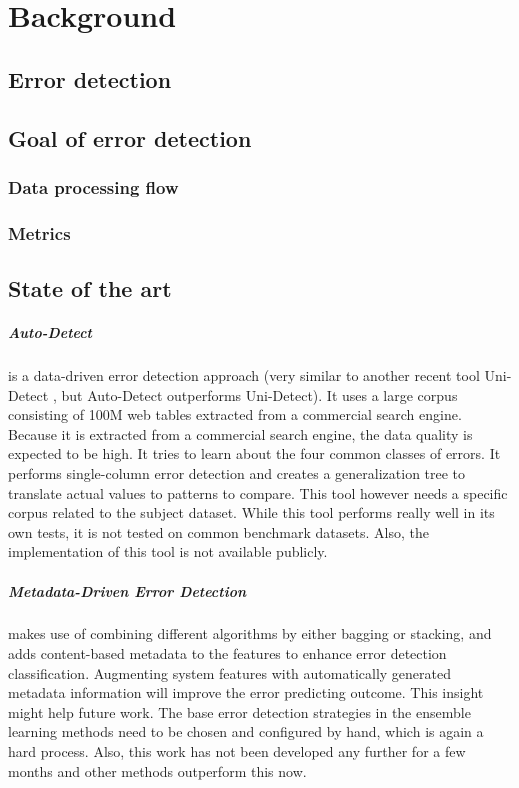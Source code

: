 \chapter{Background}
\section{Error detection}

\section{Goal of error detection}
\subsection{Data processing flow}

\subsection{Metrics}


\section{State of the art}

\paragraph{Auto-Detect \cite{Wang2019-jg}} is a data-driven error detection approach (very similar to another recent tool Uni-Detect \cite{Huang2018-er}, but Auto-Detect outperforms Uni-Detect). It uses a large corpus consisting of 100M web tables extracted from a commercial search engine. Because it is extracted from a commercial search engine, the data quality is expected to be high. It tries to learn about the four common classes of errors. It performs single-column error detection and creates a generalization tree to translate actual values to patterns to compare. This tool however needs a specific corpus related to the subject dataset. While this tool performs really well in its own tests, it is not tested on common benchmark datasets. Also, the implementation of this tool is not available publicly.

\paragraph{Metadata-Driven Error Detection \cite{Visengeriyeva2018-qz}} makes use of combining different algorithms by either bagging or stacking, and adds content-based metadata to the features to enhance error detection classification. Augmenting system features with automatically generated metadata information will improve the error predicting outcome. This insight might help future work. The base error detection strategies in the ensemble learning methods need to be chosen and configured by hand, which is again a hard process. Also, this work has not been developed any further for a few months and other methods outperform this now.

